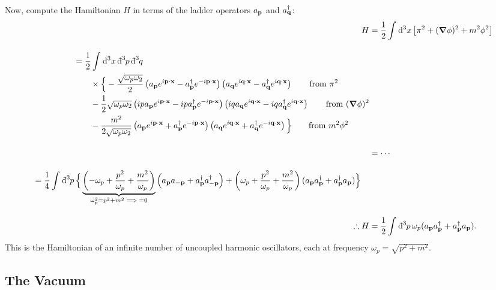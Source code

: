 Now, compute the Hamiltonian $H$ in terms of the ladder operators $a_{\vb{p}}$ and $a^{\dagger}_{\vb{q}}$:
\begin{align}
    H &= \frac{1}{2} \int_{}^{} \dd[3]{x} \left[ \pi^2 + (\grad \phi)^2 + m^2 \phi^2 \right] 
    \\[1em]
  \begin{split}
    &= \frac{1}{2} \int_{}^{} \dd[3]{x} \bdd[3]{p} \bdd[3]{q} \\
    & \qquad \times \Big\{ 
    -\frac{\sqrt{\omega_p \omega_2}}{2} \left( a_{\vb{p}} e^{i\vb{p}\cdot\vb{x}} - a^{\dagger}_{\vb{p}} e^{-i\vb{p}\cdot\vb{x}} \right)\left( a_{\vb{q}} e^{i\vb{q}\cdot\vb{x}} - a^{\dagger}_{\vb{q}} e^{i\vb{q}\cdot\vb{x}} \right) \qquad \text{from } \pi^2\\
    &\qquad-\frac{1}{2}\sqrt{\omega_p \omega_2} \left( i p a_{\vb{p}} e^{i\vb{p}\cdot\vb{x}} - ip a^{\dagger}_{\vb{p}} e^{-i\vb{p}\cdot\vb{x}} \right)
    \left(iq a_{\vb{q}} e^{i\vb{q}\cdot\vb{x}} - iqa^{\dagger}_{\vb{q}} e^{i\vb{q}\cdot\vb{x}} \right) \qquad \text{from } (\grad \phi)^2 \\
    &\qquad-\frac{m^2}{2\sqrt{\omega_p \omega_2}} \left( a_{\vb{p}} e^{i\vb{p}\cdot\vb{x}} + a^{\dagger}_{\vb{p}} e^{-i\vb{p}\cdot\vb{x}} \right)
    \left( a_{\vb{q}} e^{i\vb{q}\cdot\vb{x}} + a^{\dagger}_{\vb{q}} e^{-i\vb{q}\cdot\vb{x}} \right) \Big\} \qquad \text{from } m^2 \phi^2
  \end{split} 
  \\[1em]
  &= \cdots \nonumber
  \\[1em]
  \begin{split}
    &= \frac{1}{4} \int_{}^{} \bdd[3]{p} \Big\{ \underbrace{\left( -\omega_p + \frac{p^2}{\omega_p} + \frac{m^2}{\omega_p} \right)}_{\omega^2_p = p^2 + m^2 \implies =0} \left( a_{\vb{p}} a_{-\vb{p}} + a^{\dagger}_{\vb{p}} a_{-\vb{p}}^{\dagger} \right) + \left( \omega_p + \frac{p^2}{\omega_p} + \frac{m^2}{\omega_p} \right) (a_{\vb{p}} a^{\dagger}_{\vb{p}} + a^{\dagger}_{\vb{p}} a_{\vb{p}}) \Big\}
  \end{split}
  \\[1em]
  \therefore H &= \frac{1}{2} \int_{}^{} \bdd[3]{p} \omega_p (a_{\vb{p}} a^{\dagger}_{\vb{p}} + a^{\dagger}_{\vb{p}} a_{\vb{p}}).
\end{align}
This is the Hamiltonian of an infinite number of uncoupled harmonic oscillators, each at frequency $\omega_p = \sqrt{p^2 + m^2}$.

\subsection{The Vacuum}%
\label{sub:the_vacuum}

